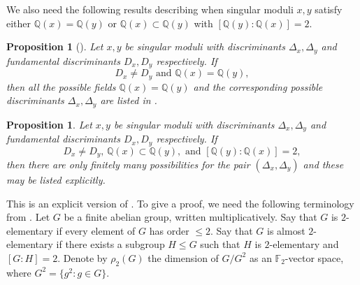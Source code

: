 \documentclass[11pt,a4paper, british]{amsart}
\newtheorem{prop}[thm]{Proposition}
\theoremstyle{definition}
\theoremstyle{remark}
\numberwithin{equation}{section}
\newcommand{\Q}{\mathbb{Q}} %
\begin{document}
We also need the following results describing when singular moduli $x, y$ satisfy either $\Q(x) = \Q(y)$ or $\Q(x) \subset \Q(y)$ with $[\Q(y) : \Q(x)] = 2$.

\begin{prop}[{\cite[Corollary~4.2]{AllombertBiluMadariaga15}}]\label{prop:difffund}
	Let $x, y$ be singular moduli with discriminants $\Delta_x, \Delta_y$ and fundamental discriminants $D_x, D_y$ respectively. If
	\[ D_x \neq D_y \mbox{ and } \Q(x) = \Q(y),\]
	then all the possible fields $\Q(x) = \Q(y)$ and the corresponding possible discriminants $\Delta_x, \Delta_y$ are listed in \cite[Table~2]{AllombertBiluMadariaga15}.
\end{prop}

\begin{prop}\label{prop:difffundsub}
	Let $x, y$ be singular moduli with discriminants $\Delta_x, \Delta_y$ and fundamental discriminants $D_x, D_y$ respectively. If
	\[ D_x \neq D_y, \, \Q(x) \subset \Q(y), \mbox{ and } [\Q(y) : \Q(x)] = 2,\] 
	then there are only finitely many possibilities for the pair $(\Delta_x, \Delta_y)$ and these may be listed explicitly.
\end{prop}

This is an explicit version of \cite[Corollary 2.13(2)]{BiluGunTron22}. To give a proof, we need the following terminology from \cite{BiluGunTron22}. Let $G$ be a finite abelian group, written multiplicatively. Say that $G$ is $2$-elementary if every element of $G$ has order $\leq 2$. Say that $G$ is almost $2$-elementary if there exists a subgroup $H \leq G$ such that $H$ is $2$-elementary and $[G : H] = 2$. Denote by $\rho_2(G)$ the dimension of $G / G^2$ as an $\mathbb{F}_2$-vector space, where $G^2 = \{g^2 : g \in G\}$.
\end{document}
